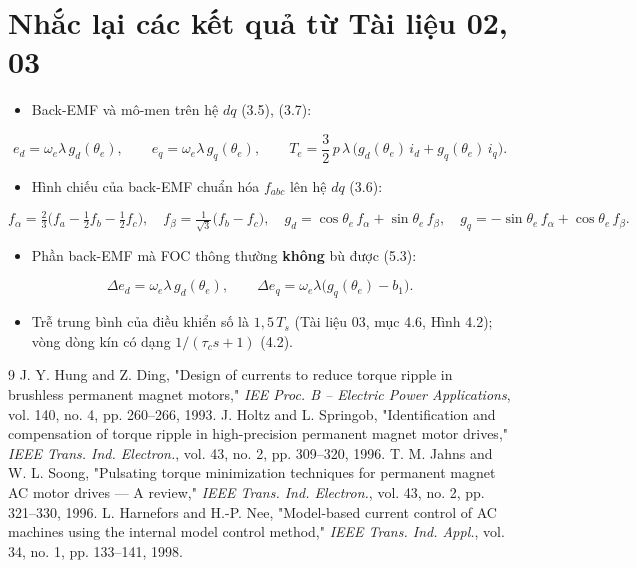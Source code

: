 \documentclass[11pt,a4paper]{article}
\begin{document}
\section*{Nhắc lại các kết quả từ Tài liệu 02, 03}

\begin{itemize}[leftmargin=*]
\item Back-EMF và mô-men trên hệ $dq$ (3.5), (3.7):
\end{itemize}

\[
e_d = \omega_e\lambda\, g_d(\theta_e), \qquad e_q = \omega_e\lambda\, g_q(\theta_e), \qquad
T_e = \frac32\,p\,\lambda\,\big(g_d(\theta_e)\, i_d + g_q(\theta_e)\, i_q\big).
\]

\begin{itemize}[leftmargin=*]
\item Hình chiếu của back-EMF chuẩn hóa $f_{abc}$ lên hệ $dq$ (3.6):
\end{itemize}

\[
f_\alpha = \tfrac23\big(f_a - \tfrac12 f_b - \tfrac12 f_c\big),\quad f_\beta = \tfrac{1}{\sqrt3}\big(f_b - f_c\big),\quad
g_d = \cos\theta_e\, f_\alpha + \sin\theta_e\, f_\beta,\quad g_q = -\sin\theta_e\, f_\alpha + \cos\theta_e\, f_\beta .
\]

\begin{itemize}[leftmargin=*]
\item Phần back-EMF mà FOC thông thường \textbf{không} bù được (5.3):
\end{itemize}

\[
\Delta e_d = \omega_e\lambda\, g_d(\theta_e), \qquad \Delta e_q = \omega_e\lambda\big(g_q(\theta_e) - b_1\big).
\]

\begin{itemize}[leftmargin=*]
\item Trễ trung bình của điều khiển số là $1{,}5\,T_s$ (Tài liệu 03, mục 4.6, Hình 4.2); vòng dòng kín có dạng $1/(\tau_c s + 1)$ (4.2).
\end{itemize}

\setcounter{section}{5}


\begin{thebibliography}{9}
\small
{} J. Y. Hung and Z. Ding, "Design of currents to reduce torque ripple in brushless permanent magnet motors," \emph{IEE Proc. B – Electric Power Applications}, vol. 140, no. 4, pp. 260–266, 1993.
 J. Holtz and L. Springob, "Identification and compensation of torque ripple in high-precision permanent magnet motor drives," \emph{IEEE Trans. Ind. Electron.}, vol. 43, no. 2, pp. 309–320, 1996.
 T. M. Jahns and W. L. Soong, "Pulsating torque minimization techniques for permanent magnet AC motor drives — A review," \emph{IEEE Trans. Ind. Electron.}, vol. 43, no. 2, pp. 321–330, 1996.
 L. Harnefors and H.-P. Nee, "Model-based current control of AC machines using the internal model control method," \emph{IEEE Trans. Ind. Appl.}, vol. 34, no. 1, pp. 133–141, 1998.
\end{thebibliography}
\end{document}
